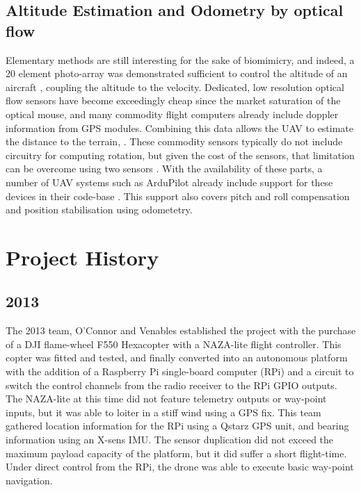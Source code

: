 \documentclass[a4paper, 11pt, titlepage]{article}
\begin{document}
    \subsection{Altitude Estimation and Odometry by optical flow}
      Elementary methods are still interesting for the sake of biomimicry, and indeed, a 20 element photo-array was demonstrated sufficient to control the altitude of an aircraft \cite{optoAlt}, coupling the altitude to the velocity.
      Dedicated, low resolution optical flow sensors have become exceedingly cheap since the market saturation of the optical mouse, and many commodity flight computers already include doppler information from GPS modules. 
      Combining this data allows the UAV to estimate the distance to the terrain, \cite{RemTerrain}.  These commodity sensors typically do not include circuitry for computing rotation, but given the cost of the sensors, that limitation can be overcome using two sensors \cite{FlowRot}.
      With the availability of these parts, a number of UAV systems such as ArduPilot already include support for these devices in their code-base \cite{ArduFlow}.
      This support also covers pitch and roll compensation and position stabilisation using odometetry.


\section{Project History}

    \subsection{2013}
      The 2013 team, O'Connor \cite{OConnor} and Venables \cite{Venables} established the project with the purchase of a DJI flame-wheel F550 Hexacopter with a NAZA-lite flight controller.  This copter was fitted and tested, and finally converted into an autonomous platform with the addition of a Raspberry Pi single-board computer (RPi) and a circuit to switch the control channels from the radio receiver to the RPi GPIO outputs.
      The NAZA-lite at this time did not feature telemetry outputs or way-point inputs, but it was able to loiter in a stiff wind using a GPS fix.
      This team gathered location information for the RPi using a Qstarz GPS unit, and bearing information using an X-sens IMU.  The sensor duplication did not exceed the maximum payload capacity of the platform, but it did suffer a short flight-time.
      Under direct control from the RPi, the drone was able to execute basic way-point navigation.
\end{document}
